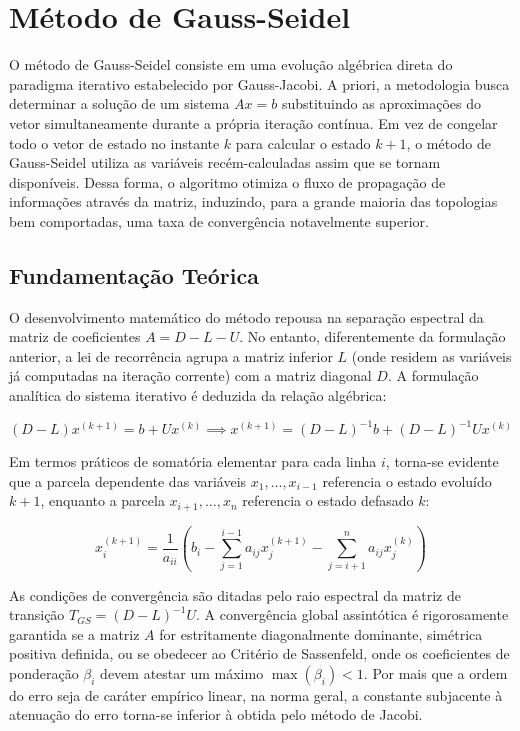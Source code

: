 \section{Método de Gauss-Seidel}

O método de Gauss-Seidel consiste em uma evolução algébrica direta do paradigma iterativo estabelecido por Gauss-Jacobi. A priori, a metodologia busca determinar a solução de um sistema $Ax = b$ substituindo as aproximações do vetor simultaneamente durante a própria iteração contínua. Em vez de congelar todo o vetor de estado no instante $k$ para calcular o estado $k+1$, o método de Gauss-Seidel utiliza as variáveis recém-calculadas assim que se tornam disponíveis. Dessa forma, o algoritmo otimiza o fluxo de propagação de informações através da matriz, induzindo, para a grande maioria das topologias bem comportadas, uma taxa de convergência notavelmente superior.

\subsection{Fundamentação Teórica}

O desenvolvimento matemático do método repousa na separação espectral da matriz de coeficientes $A = D - L - U$. No entanto, diferentemente da formulação anterior, a lei de recorrência agrupa a matriz inferior $L$ (onde residem as variáveis já computadas na iteração corrente) com a matriz diagonal $D$. A formulação analítica do sistema iterativo é deduzida da relação algébrica:

\begin{equation}
    (D - L)x^{(k+1)} = b + U x^{(k)} \implies x^{(k+1)} = (D - L)^{-1} b + (D - L)^{-1} U x^{(k)}
\end{equation}

Em termos práticos de somatória elementar para cada linha $i$, torna-se evidente que a parcela dependente das variáveis $x_1, \dots, x_{i-1}$ referencia o estado evoluído $k+1$, enquanto a parcela $x_{i+1}, \dots, x_n$ referencia o estado defasado $k$:

\begin{equation}
    x_i^{(k+1)} = \frac{1}{a_{ii}} \left( b_i - \sum_{j=1}^{i-1} a_{ij} x_j^{(k+1)} - \sum_{j=i+1}^{n} a_{ij} x_j^{(k)} \right)
\end{equation}

As condições de convergência são ditadas pelo raio espectral da matriz de transição $T_{GS} = (D - L)^{-1} U$. A convergência global assintótica é rigorosamente garantida se a matriz $A$ for estritamente diagonalmente dominante, simétrica positiva definida, ou se obedecer ao Critério de Sassenfeld, onde os coeficientes de ponderação $\beta_i$ devem atestar um máximo $\max(\beta_i) < 1$. Por mais que a ordem do erro seja de caráter empírico linear, na norma geral, a constante subjacente à atenuação do erro torna-se inferior à obtida pelo método de Jacobi.


